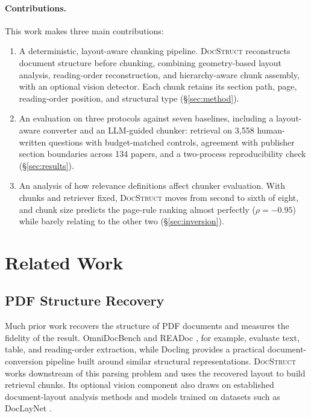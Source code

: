 \documentclass[11pt]{article}
\newcommand{\ds}{\textsc{DocStruct}}
\begin{document}
\paragraph{Contributions.}
This work makes three main contributions:

\begin{enumerate}\itemsep2pt
\item A deterministic, layout-aware chunking pipeline. \ds{} reconstructs document structure before chunking, combining geometry-based layout analysis, reading-order reconstruction, and hierarchy-aware chunk assembly, with an optional vision detector. Each chunk retains its section path, page, reading-order position, and structural type (\S\ref{sec:method}).

\item An evaluation on three protocols against seven baselines, including a layout-aware converter and an LLM-guided chunker: retrieval on 3{,}558 human-written questions with budget-matched controls, agreement with publisher section boundaries across 134 papers, and a two-process reproducibility check (\S\ref{sec:results}).

\item An analysis of how relevance definitions affect chunker evaluation. With chunks and retriever fixed, \ds{} moves from second to sixth of eight, and chunk size predicts the page-rule ranking almost perfectly ($\rho=-0.95$) while barely relating to the other two (\S\ref{sec:inversion}).
\end{enumerate}

\section{Related Work}
\label{sec:related}

\subsection{PDF Structure Recovery}

Much prior work recovers the structure of PDF documents and measures the fidelity of the result. OmniDocBench \citep{ouyang2025omnidocbench} and READoc \citep{li2025readoc}, for example, evaluate text, table, and reading-order extraction, while Docling \citep{auer2024docling} provides a practical document-conversion pipeline built around similar structural representations. \ds{} works downstream of this parsing problem and uses the recovered layout to build retrieval chunks. Its optional vision component also draws on established document-layout analysis methods and models trained on datasets such as DocLayNet \citep{pfitzmann2022doclaynet}.
\end{document}
